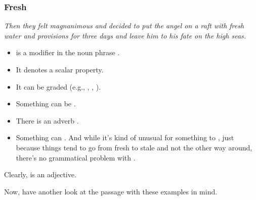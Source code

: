 \subsubsection*{Fresh}
\textit{Then they felt magnanimous and decided to put the angel on a raft with \emph{fresh} water and provisions for three days and leave him to his fate on the high seas.}

\begin{itemize}[noitemsep]
    \item {} is a modifier in the noun phrase .
    \item It denotes a scalar property.
    \item It can be graded (e.g., , , ).
    \item Something can be .
    \item There is an adverb .
    \item Something can . And while it's kind of unusual for something to , just because things tend to go from fresh to stale and not the other way around, there's no grammatical problem with .
\end{itemize}
Clearly,  is an adjective.


Now, have another look at the passage with these examples in mind.

